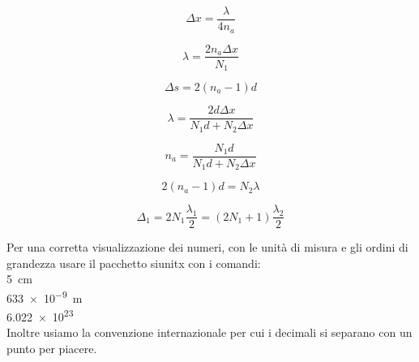 \documentclass[a4paper,11pt]{article}
\begin{document}
	\label{interf} %
	\label{strum} %
	\label{calib} %
	
	\begin{equation}\label{delta}
	\Delta x = \dfrac{\lambda}{4n_a}
	\end{equation}
	
	\begin{equation}\label{lambdana}
	\lambda=\dfrac{2n_a\Delta x}{N_1}		
	\end{equation}
	
	\begin{equation}\label{deltavuoto}
	\Delta s = 2(n_a-1)d
	\end{equation}
	
	\begin{equation}\label{lambda}
	\lambda=\dfrac{2d\Delta x}{N_1 d + N_2 \Delta x}
	\end{equation}
	
	\begin{equation}\label{na}
	n_a=\dfrac{N_1 d}{N_1 d + N_2 \Delta x}
	\end{equation}
	
	\begin{equation}\label{indice_aria}
	2 (n_a - 1) d = N_2 \lambda
	\end{equation}
	
	\begin{equation}\label{delta1}
	\Delta_1=2N_1\frac{\lambda_1}{2}=(2N_1+1)\frac{\lambda_2}{2}
	\end{equation}
	
	Per una corretta visualizzazione dei numeri, con le unità di misura e gli ordini di grandezza usare il pacchetto siunitx con i comandi:\\
	
		\SI{5}{\centi\meter}
	\\
		\SI{633e-9}{\meter}
	\\
		\num{6.022e23}
	\\
	Inoltre usiamo la convenzione internazionale per cui i decimali si separano con un punto per piacere.
	

	
\end{document}

